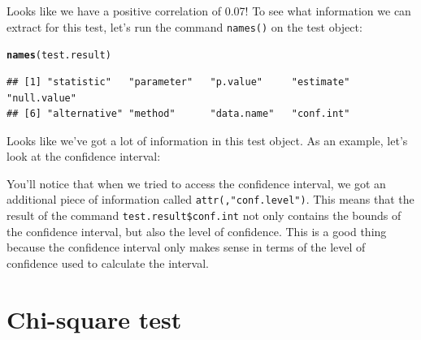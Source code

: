 \documentclass{tufte-book}\usepackage[]{graphicx}\usepackage[]{color}
\makeatletter
\newcommand{\hlopt}[1]{\textcolor[rgb]{0,0,0}{#1}}%
\newcommand{\hlstd}[1]{\textcolor[rgb]{0.345,0.345,0.345}{#1}}%
\newcommand{\hlkwd}[1]{\textcolor[rgb]{0.737,0.353,0.396}{\textbf{#1}}}%
\newenvironment{kframe}{%
 \def\at@end@of@kframe{}%
 \ifinner\ifhmode%
  \def\at@end@of@kframe{\end{minipage}}%
  \begin{minipage}{\columnwidth}%
 \fi\fi%
 \def\FrameCommand##1{\hskip\@totalleftmargin \hskip-\fboxsep
 \colorbox{shadecolor}{##1}\hskip-\fboxsep
     \hskip-\linewidth \hskip-\@totalleftmargin \hskip\columnwidth}%
 \MakeFramed {\advance\hsize-\width
   \@totalleftmargin\z@ \linewidth\hsize
   \@setminipage}}%
 {\par\unskip\endMakeFramed%
 \at@end@of@kframe}
\newenvironment{knitrout}{}{} %
\makeatother
\begin{document}
\begin{footnotesize}
Looks like we have a positive correlation of 0.07! To see what information we can extract for this test, let's run the command \texttt{names()} on the test object:

\begin{footnotesize}
\begin{knitrout}
\color{fgcolor}\begin{kframe}
\begin{alltt}
\hlkwd{names}\hlstd{(test.result)}
\end{alltt}
\begin{verbatim}
## [1] "statistic"   "parameter"   "p.value"     "estimate"    "null.value" 
## [6] "alternative" "method"      "data.name"   "conf.int"
\end{verbatim}
\end{kframe}
\end{knitrout}
\end{footnotesize}

Looks like we've got a lot of information in this test object. As an example, let's look at the confidence interval:


You'll notice that when we tried to access the confidence interval, we got an additional piece of information called \texttt{attr(,"conf.level")}. This means that the result of the command \texttt{test.result\$conf.int} not only contains the bounds of the confidence interval, but also the level of confidence. This is a good thing because the confidence interval only makes sense in terms of the level of confidence used to calculate the interval.

\section{Chi-square test}


\end{footnotesize}
\end{document}
